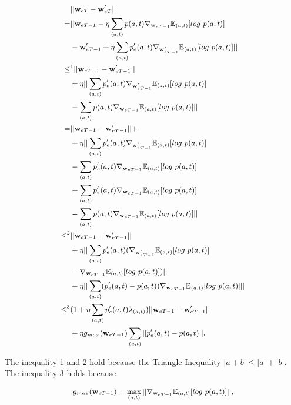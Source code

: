 \begin{equation}
\label{Eq:Proof of weight error}
\small
    \begin{aligned}
        &||\mathbf w_{eT}-\mathbf w'_{eT}||\\
        =&||\mathbf w_{eT-1}-\eta\sum_{(a,t)}p(a,t)\nabla_{\mathbf w_{eT-1}}\mathbb{E}_{(a,t)}[log\ p(a,t)]\\
        &-\mathbf w'_{eT-1}+\eta\sum_{(a,t)}p_e'(a,t)\nabla_{\mathbf w'_{eT-1}}\mathbb{E}_{(a,t)}[log\ p(a,t)]||\\
        \leq&^1||\mathbf w_{eT-1}-\mathbf w'_{eT-1}||\\
        &+\eta||\sum_{(a,t)}p_e'(a,t)\nabla_{\mathbf w'_{eT-1}}\mathbb{E}_{(a,t)}[log\ p(a,t)]\\
        &-\sum_{(a,t)}p(a,t)\nabla_{\mathbf w_{eT-1}}\mathbb{E}_{(a,t)}[log\ p(a,t)]||\\
        =&||\mathbf w_{eT-1}-\mathbf w'_{eT-1}||+\\
        &+\eta||\sum_{(a,t)}p_e'(a,t)\nabla_{\mathbf w'_{eT-1}}\mathbb{E}_{(a,t)}[log\ p(a,t)]\\
        &-\sum_{(a,t)}p'_e(a,t)\nabla_{\mathbf w_{eT-1}}\mathbb{E}_{(a,t)}[log\ p(a,t)]\\
        &+\sum_{(a,t)}p'_e(a,t)\nabla_{\mathbf w_{eT-1}}\mathbb{E}_{(a,t)}[log\ p(a,t)]\\
        &-\sum_{(a,t)}p(a,t)\nabla_{\mathbf w_{eT-1}}\mathbb{E}_{(a,t)}[log\ p(a,t)]||\\
        \leq^2&||\mathbf w_{eT-1}-\mathbf w'_{eT-1}||\\
        &+\eta||\sum_{(a,t)}p'_e(a,t)(\nabla_{\mathbf w'_{eT-1}}\mathbb{E}_{(a,t)}[log\ p(a,t)]\\
        &-\nabla_{\mathbf w_{eT-1}}\mathbb{E}_{(a,t)}[log\ p(a,t)])||\\
        &+\eta||\sum_{(a,t)}(p'_e(a,t)-p(a,t))\nabla_{\mathbf w_{eT-1}}\mathbb{E}_{(a,t)}[log\ p(a,t)]||\\
        \leq^3&(1+\eta\sum_{(a,t)}p'_e(a,t)\lambda_{(a,t)})||\mathbf w_{eT-1}-\mathbf w'_{eT-1}||\\
        &+\eta g_{max}(\mathbf w_{eT-1})\sum_{(a,t)}||p'_e(a,t)-p(a,t)||.
    \end{aligned}
\end{equation}

The inequality 1 and 2 hold because the Triangle Inequality $|a+b|\leq|a|+|b|$. The inequality 3 holds because

\begin{equation}
\small
    \begin{aligned}
    g_{max}(\mathbf w_{eT-1})=\max_{(a,t)}||\nabla_{\mathbf w_{eT-1}}\mathbb{E}_{(a,t)}[log\ p(a,t)]||,
    \end{aligned}
\end{equation}

